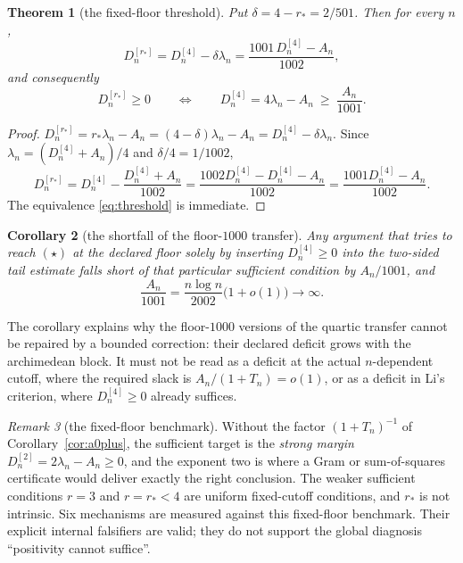 \documentclass[11pt]{amsart}
\newtheorem{theorem}{Theorem}[section]
\newtheorem{corollary}[theorem]{Corollary}
\theoremstyle{definition}
\theoremstyle{remark}
\newtheorem{remark}[theorem]{Remark}
\theoremstyle{definition}
\begin{document}
\begin{theorem}[the fixed-floor threshold]\label{thm:threshold}
Put $\delta=4-r_*=2/501$. Then for every $n$,
\begin{equation}\label{eq:threshold-id}
   D_n^{[r_*]}=D_n^{[4]}-\delta\lambda_n
   =\frac{1001\,D_n^{[4]}-A_n}{1002},
\end{equation}
and consequently
\begin{equation}\label{eq:threshold}
   \boxed{\ D_n^{[r_*]}\ge0
   \qquad\Longleftrightarrow\qquad
   D_n^{[4]}=4\lambda_n-A_n\ \ge\ \frac{A_n}{1001}. \ }
\end{equation}
\end{theorem}

\begin{proof}
$D_n^{[r_*]}=r_*\lambda_n-A_n=(4-\delta)\lambda_n-A_n=D_n^{[4]}-\delta\lambda_n$. Since
$\lambda_n=(D_n^{[4]}+A_n)/4$ and $\delta/4=1/1002$,
\[
   D_n^{[r_*]}=D_n^{[4]}-\frac{D_n^{[4]}+A_n}{1002}
   =\frac{1002D_n^{[4]}-D_n^{[4]}-A_n}{1002}
   =\frac{1001D_n^{[4]}-A_n}{1002}.
\]
The equivalence \eqref{eq:threshold} is immediate.
\end{proof}

\begin{corollary}[the shortfall of the floor-$1000$ transfer]\label{cor:shortfall}
Any argument that tries to reach $(\star)$ at the declared floor solely by inserting
$D_n^{[4]}\ge0$ into the two-sided tail estimate falls short of that particular sufficient
condition by $A_n/1001$, and
\[
   \frac{A_n}{1001}=\frac{n\log n}{2002}\bigl(1+o(1)\bigr)\longrightarrow\infty .
\]
\end{corollary}

The corollary explains why the floor-$1000$ versions of the quartic transfer cannot be repaired
by a bounded correction: their declared deficit grows with the archimedean block.  It must not be
read as a deficit at the actual $n$-dependent cutoff, where the required slack is
$A_n/(1+T_n)=o(1)$, or as a deficit in Li's criterion, where $D_n^{[4]}\ge0$ already suffices.

\begin{remark}[the fixed-floor benchmark]\label{rmk:chronology}
Without the factor $(1+T_n)^{-1}$ of Corollary~\ref{cor:a0plus}, the sufficient target is the
\emph{strong margin} $D_n^{[2]}=2\lambda_n-A_n\ge0$, and the exponent two is where a Gram or
sum-of-squares certificate would deliver exactly the right conclusion. The weaker sufficient
conditions $r=3$ and $r=r_*<4$ are uniform fixed-cutoff conditions, and $r_*$ is not intrinsic.
Six mechanisms are measured against this fixed-floor benchmark.  Their explicit internal
falsifiers are valid; they do not support the global diagnosis ``positivity cannot suffice''.
\end{remark}
\end{document}

